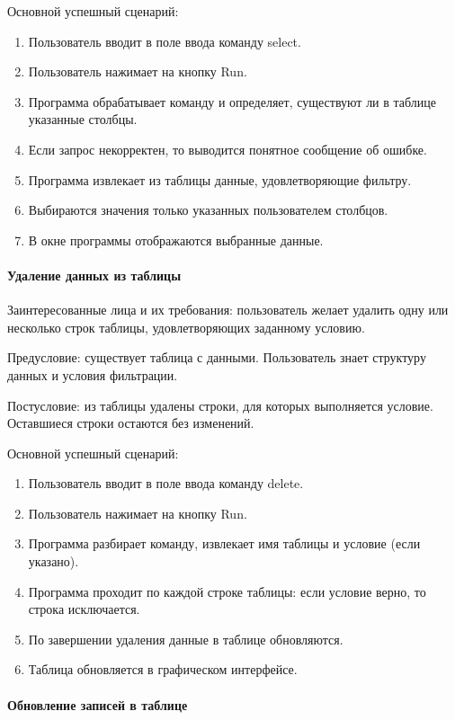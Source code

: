 Основной успешный сценарий:
\begin{enumerate}
	\item Пользователь вводит в поле ввода команду select.
	\item Пользователь нажимает на кнопку Run.	
	\item Программа обрабатывает команду и определяет, существуют ли в таблице указанные столбцы.
	\item Если запрос некорректен, то выводится понятное сообщение об ошибке.
	\item Программа извлекает из таблицы данные, удовлетворяющие фильтру.	
	\item Выбираются значения только указанных пользователем столбцов.	
	\item В окне программы отображаются выбранные данные.		
\end{enumerate}

\paragraph{Удаление данных из таблицы}

Заинтересованные лица и их требования: пользователь желает удалить одну или несколько строк таблицы, удовлетворяющих заданному условию.

Предусловие: существует таблица с данными. Пользователь знает структуру данных и условия фильтрации.

Постусловие: из таблицы удалены строки, для которых выполняется условие. Оставшиеся строки остаются без изменений.

Основной успешный сценарий:
\begin{enumerate}
	\item Пользователь вводит в поле ввода команду delete.
	\item Пользователь нажимает на кнопку Run.		
	\item Программа разбирает команду, извлекает имя таблицы и условие (если указано).		
	\item Программа проходит по каждой строке таблицы: если условие верно, то строка исключается.	
	\item По завершении удаления данные в таблице обновляются.	
	\item Таблица обновляется в графическом интерфейсе.
\end{enumerate}

\paragraph{Обновление записей в таблице}

